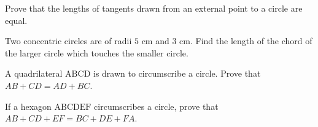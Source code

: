 \documentclass[12pt,a4paper]{exam}
\begin{document}
\begin{questions}
\question[5] Prove that the lengths of tangents drawn from an external point to a circle are equal.
\vspace{0.15cm}

\question[5] Two concentric circles are of radii $5\text{ cm}$ and $3\text{ cm}$. Find the length of the chord of the larger circle which touches the smaller circle.
\vspace{0.15cm}

\question[5] A quadrilateral $\text{ABCD}$ is drawn to circumscribe a circle. Prove that $AB + CD = AD + BC$.
\vspace{0.15cm}

\question[5] If a hexagon $\text{ABCDEF}$ circumscribes a circle, prove that $AB + CD + EF = BC + DE + FA$.
\vspace{0.15cm}

\end{questions}
\bigskip
\end{document}
